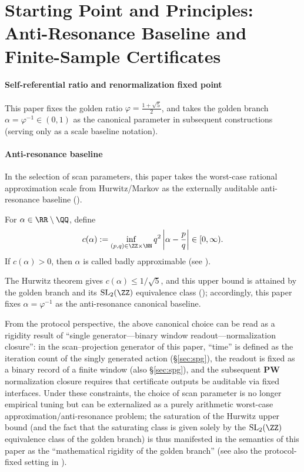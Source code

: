 \section{Starting Point and Principles: Anti-Resonance Baseline and Finite-Sample Certificates}\label{sec:principles}

\paragraph{Self-referential ratio and renormalization fixed point}

This paper fixes the golden ratio \(\varphi=\frac{1+\sqrt5}{2}\), and takes the golden branch \(\alpha=\varphi^{-1}\in(0,1)\) as the canonical parameter in subsequent constructions (serving only as a scale baseline notation).

\paragraph{Anti-resonance baseline}

In the selection of scan parameters, this paper takes the worst-case rational approximation scale from Hurwitz/Markov as the externally auditable anti-resonance baseline (\cite{Cassels1957,KuipersNiederreiter1974}).

\begin{definition}\label{def:markov-constant}
For $\alpha\in\RR\setminus\QQ$, define
\[
c(\alpha):=\inf_{(p,q)\in\ZZ\times\NN} q^2\left|\alpha-\frac{p}{q}\right|\in[0,\infty).
\]
If $c(\alpha)>0$, then $\alpha$ is called badly approximable (see \cite{Cassels1957,KuipersNiederreiter1974}).
\end{definition}

The Hurwitz theorem gives \(c(\alpha)\le 1/\sqrt5\), and this upper bound is attained by the golden branch and its \(\mathrm{SL}_2(\ZZ)\) equivalence class (\cite{Cassels1957,KuipersNiederreiter1974}); accordingly, this paper fixes \(\alpha=\varphi^{-1}\) as the anti-resonance canonical baseline.
\par
From the protocol perspective, the above canonical choice can be read as a rigidity result of ``single generator---binary window readout---normalization closure'': in the scan--projection generator of this paper, ``time'' is defined as the iteration count of the singly generated action (\S\ref{sec:spg}), the readout is fixed as a binary record of a finite window (also \S\ref{sec:spg}), and the subsequent \(\mathbf{PW}\) normalization closure requires that certificate outputs be auditable via fixed interfaces.
Under these constraints, the choice of scan parameter is no longer empirical tuning but can be externalized as a purely arithmetic worst-case approximation/anti-resonance problem; the saturation of the Hurwitz upper bound (and the fact that the saturating class is given solely by the \(\mathrm{SL}_2(\ZZ)\) equivalence class of the golden branch) is thus manifested in the semantics of this paper as the ``mathematical rigidity of the golden branch'' (see also the protocol-fixed setting in \cite{Internal2026POMGenerativeAddressThreeRegisterBridgeRH}).

